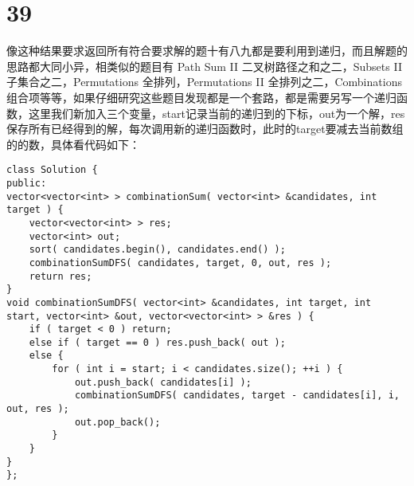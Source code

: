 \documentclass[12pt,a4paper]{article}
\begin{document}
\section{39}
\begin{CJK}{UTF8}{gbsn}
像这种结果要求返回所有符合要求解的题十有八九都是要利用到递归，而且解题的思路都大同小异，相类似的题目有 Path Sum II 二叉树路径之和之二，Subsets II 子集合之二，Permutations 全排列，Permutations II 全排列之二，Combinations 组合项等等，如果仔细研究这些题目发现都是一个套路，都是需要另写一个递归函数，这里我们新加入三个变量，start记录当前的递归到的下标，out为一个解，res保存所有已经得到的解，每次调用新的递归函数时，此时的target要减去当前数组的的数，具体看代码如下：
\end{CJK}
\begin{lstlisting}
class Solution {
public:
vector<vector<int> > combinationSum( vector<int> &candidates, int target ) {
	vector<vector<int> > res;
	vector<int> out;
	sort( candidates.begin(), candidates.end() );
	combinationSumDFS( candidates, target, 0, out, res );
	return res;
}
void combinationSumDFS( vector<int> &candidates, int target, int start, vector<int> &out, vector<vector<int> > &res ) {
	if ( target < 0 ) return;
	else if ( target == 0 ) res.push_back( out );
	else {
		for ( int i = start; i < candidates.size(); ++i ) {
			out.push_back( candidates[i] );
			combinationSumDFS( candidates, target - candidates[i], i, out, res );
			out.pop_back();
		}
	}
}
};
\end{lstlisting}
\end{document}
